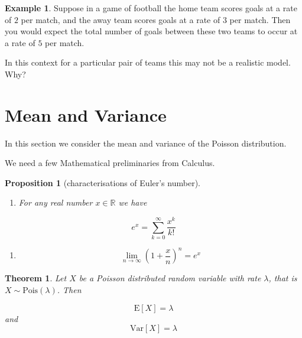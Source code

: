 \documentclass[
]{book}
\providecommand{\tightlist}{%
  \setlength{\itemsep}{0pt}\setlength{\parskip}{0pt}}
\newtheorem{theorem}{Theorem}[chapter]
\newtheorem{proposition}{Proposition}[chapter]
\theoremstyle{definition}
\theoremstyle{definition}
\newtheorem{example}{Example}[chapter]
\theoremstyle{definition}
\theoremstyle{definition}
\theoremstyle{remark}
\begin{document}
\begin{example}
Suppose in a game of football the home team scores goals at a rate of \(2\) per match, and the away team scores goals at a rate of \(3\) per match. Then you would expect the total number of goals between these two teams to occur at a rate of \(5\) per match.

In this context for a particular pair of teams this may not be a realistic model. Why?
\end{example}

\hypertarget{mean-and-variance-1}{%
\section{Mean and Variance}\label{mean-and-variance-1}}

In this section we consider the mean and variance of the Poisson distribution.

We need a few Mathematical preliminaries from Calculus.

\begin{proposition}[characterisations of Euler's number]
\leavevmode

\begin{enumerate}
\def\labelenumi{\Alph{enumi})}
\tightlist
\item
  For any real number \(x \in \mathbb{R}\) we have
\end{enumerate}

\[e^x = \sum_{k=0}^{\infty} \frac{x^k}{k!}\]

\begin{enumerate}
\def\labelenumi{\Alph{enumi})}
\setcounter{enumi}{1}
\tightlist
\item
  \[ \lim_{n\to \infty} \left( 1+\frac{x}{n} \right)^n = e^x\]
\end{enumerate}

\end{proposition}

\begin{theorem}
Let \(X\) be a Poisson distributed random variable with rate \(\lambda\), that is \(X\sim \text{Pois}(\lambda)\). Then

\[\text{E}[X]  = \lambda\]
and
\[\text{Var}[X] = \lambda\]
\end{theorem}
\end{document}
